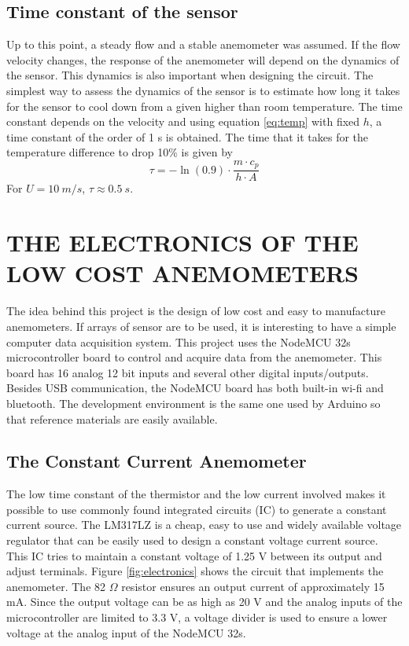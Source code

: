 \documentclass[10pt,fleqn,a4paper,twoside]{article}
\begin{document}
\subsection{Time constant of the sensor}

Up to this point, a steady flow and a stable anemometer was assumed. If the flow velocity changes, the response of the anemometer will depend on the dynamics of the sensor. This dynamics is also important when designing the circuit. The simplest way to assess the dynamics of the sensor is to estimate how long it takes for the sensor to cool down from a given higher than room temperature. The time constant depends on the velocity and using equation \ref{eq:temp} with fixed $h$, a time constant of the order of 1 s  is obtained. The time that it takes for the temperature difference to drop 10\% is given by
\begin{equation}
  \tau = -\ln(0.9) \cdot \frac{m\cdot c_p}{h\cdot A}
  \label{eq:timeconst}
\end{equation}
For $U=10\:m/s$, $\tau \approx 0.5\:s$.


\section{THE ELECTRONICS OF THE LOW COST ANEMOMETERS}
The idea behind this project is the design of low cost and easy to manufacture anemometers. If arrays of sensor are to be used, it is interesting to have a simple computer data acquisition system. This project uses the NodeMCU 32s microcontroller board to control and acquire data from the anemometer. This board has 16 analog 12 bit inputs and several other digital inputs/outputs. Besides USB communication, the NodeMCU board has both built-in wi-fi and bluetooth. The development environment is the same one used by Arduino so that reference materials are easily available.

\subsection{The Constant Current Anemometer}
The low time constant of the thermistor and the low current involved makes it possible to use commonly found integrated circuits (IC) to generate a constant current source. The LM317LZ is a cheap, easy to use and widely available voltage regulator that can be easily used to design a constant voltage current source. This IC tries to maintain a constant voltage of 1.25 V between its output and adjust terminals. Figure \ref{fig:electronics} shows the circuit that implements the anemometer. The 82 $\Omega$ resistor ensures an output current of approximately 15 mA. Since the output voltage can be as high as 20 V and the analog inputs of the microcontroller are limited to 3.3 V, a voltage divider is used to ensure a lower voltage at the analog input of the NodeMCU 32s.
\end{document}
